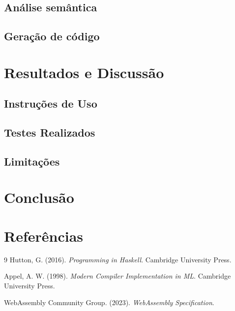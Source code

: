 \documentclass[12pt,a4paper]{article}
\begin{document}
\subsection{Análise semântica}

\subsection{Geração de código}

\section{Resultados e Discussão}

\subsection{Instruções de Uso}


\subsection{Testes Realizados}


\subsection{Limitações}

\section{Conclusão}

\section{Referências}

\begin{thebibliography}{9}
Hutton, G. (2016). \emph{Programming in Haskell}. Cambridge University Press.

Appel, A. W. (1998). \emph{Modern Compiler Implementation in ML}. Cambridge University Press.

WebAssembly Community Group. (2023). \emph{WebAssembly Specification}.
\end{thebibliography}
\end{document}
